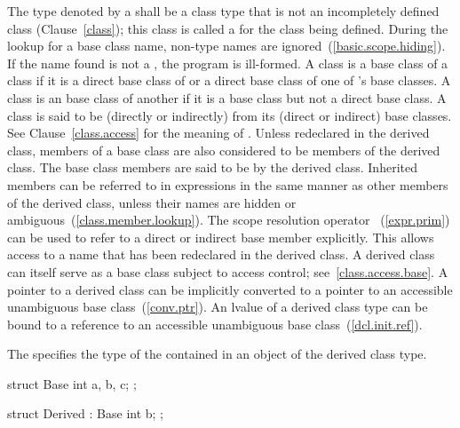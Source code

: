 \pnum
{}%
The type denoted by a  shall be
a class type that is not
an
incompletely defined class (Clause~\ref{class}); this class is called a
%
for the class being defined.
%
%
During the lookup for a base class name, non-type names are
ignored~(\ref{basic.scope.hiding}). If the name found is not a
, the program is ill-formed. A class  is a
base class of a class  if it is a direct base class of
 or a direct base class of one of 's base classes.
%
A class is an  base class of another if it is a base
class but not a direct base class. A class is said to be (directly or
indirectly)  from its (direct or indirect) base
classes.
\enternote
See Clause~\ref{class.access} for the meaning of
.
\exitnote
{}%
Unless redeclared in the derived class, members of a base class are also
considered to be members of the derived class. The base class members
are said to be
%
by the derived class. Inherited members can be referred to in
expressions in the same manner as other members of the derived class,
unless their names are hidden or ambiguous~(\ref{class.member.lookup}).
%
\enternote
The scope resolution operator \tcode{::}~(\ref{expr.prim}) can be used
to refer to a direct or indirect base member explicitly. This allows
access to a name that has been redeclared in the derived class. A
derived class can itself serve as a base class subject to access
control; see~\ref{class.access.base}. A pointer to a derived class can be
implicitly converted to a pointer to an accessible unambiguous base
class~(\ref{conv.ptr}). An lvalue of a derived class type can be bound
to a reference to an accessible unambiguous base
class~(\ref{dcl.init.ref}).
\exitnote

\pnum
The  specifies the type of the
 contained in an
object of the derived class type.
\enterexample
{}%
\begin{codeblock}
struct Base {
  int a, b, c;
};
\end{codeblock}

\begin{codeblock}
struct Derived : Base {
  int b;
};
\end{codeblock}


